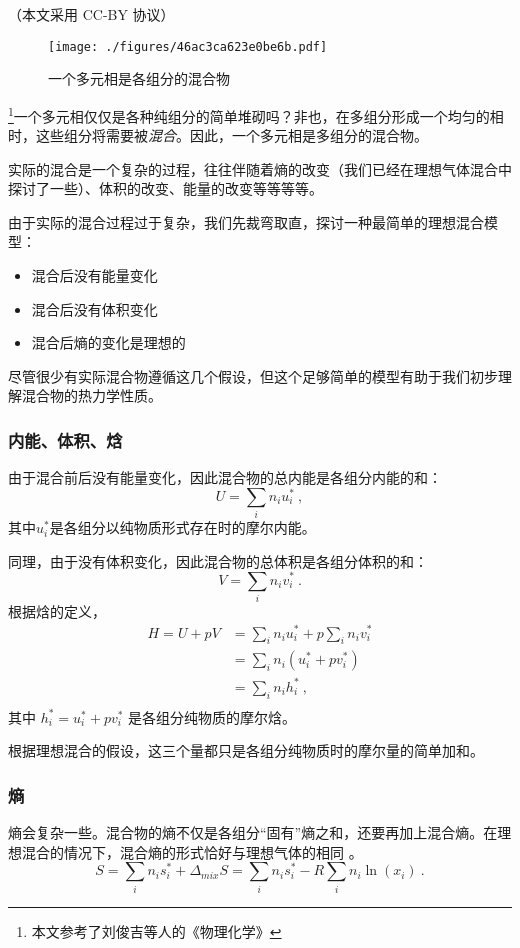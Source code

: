 

（本文采用 CC-BY 协议）

\begin{figure}[ht]
\centering
\texttt{[image: ./figures/46ac3ca623e0be6b.pdf]}
\caption{一个多元相是各组分的混合物} \label{fig_IMCPTV_1}
\end{figure}

\footnote{本文参考了刘俊吉等人的《物理化学》}一个多元相仅仅是各种纯组分的简单堆砌吗？非也，在多组分形成一个均匀的相时，这些组分将需要被\textsl{混合}。因此，一个多元相是多组分的混合物。

实际的混合是一个复杂的过程，往往伴随着熵的改变（我们已经在理想气体混合中探讨了一些）、体积的改变、能量的改变等等等等。

由于实际的混合过程过于复杂，我们先裁弯取直，探讨一种最简单的理想混合模型：
\begin{itemize}
\item 混合后没有能量变化
\item 混合后没有体积变化
\item 混合后熵的变化是理想的
\end{itemize}
尽管很少有实际混合物遵循这几个假设，但这个足够简单的模型有助于我们初步理解混合物的热力学性质。

\subsubsection{内能、体积、焓}
由于混合前后没有能量变化，因此混合物的总内能是各组分内能的和：
$$
U = \sum_i n_i u_i^*~,
$$
其中$u_i^*$是各组分以纯物质形式存在时的摩尔内能。

同理，由于没有体积变化，因此混合物的总体积是各组分体积的和：
$$
V = \sum_i n_i v_i^*~.
$$
根据焓的定义，
$$
\begin{aligned}
H=U+pV&=\sum_i n_i u_i^*+p\sum_i n_i v_i^*\\
&=\sum_i n_i (u_i^*+p v_i^*)\\
&=\sum_i n_i h_i^*~,\\
\end{aligned}
$$
其中 $h^*_i = u_i^* + p v_i^*$ 是各组分纯物质的摩尔焓。

根据理想混合的假设，这三个量都只是各组分纯物质时的摩尔量的简单加和。

\subsubsection{熵}
熵会复杂一些。混合物的熵不仅是各组分“固有”熵之和，还要再加上混合熵。在理想混合的情况下，混合熵的形式恰好与理想气体的相同 。%
$$S = \sum_i n_i s_i^* + \Delta_{mix} S = \sum_i n_i s_i^* - R \sum_i n_i \ln (x_i)~. $$

